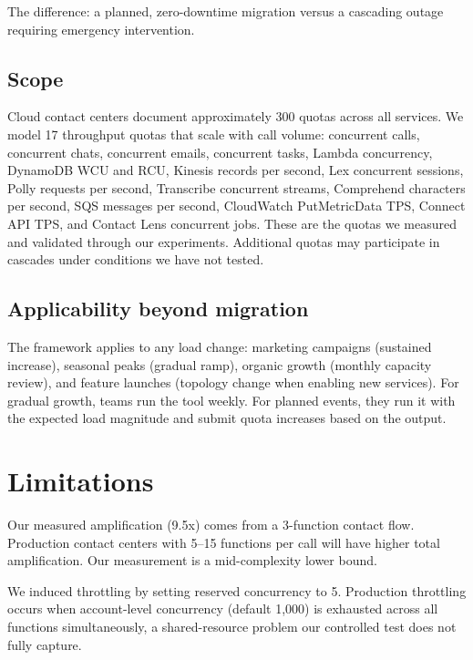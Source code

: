 \documentclass{article}
\begin{document}
The difference: a planned, zero-downtime migration versus a cascading outage requiring emergency intervention.

\subsection{Scope}

Cloud contact centers document approximately 300 quotas across all services. We model 17 throughput quotas that scale with call volume: concurrent calls, concurrent chats, concurrent emails, concurrent tasks, Lambda concurrency, DynamoDB WCU and RCU, Kinesis records per second, Lex concurrent sessions, Polly requests per second, Transcribe concurrent streams, Comprehend characters per second, SQS messages per second, CloudWatch PutMetricData TPS, Connect API TPS, and Contact Lens concurrent jobs. These are the quotas we measured and validated through our experiments. Additional quotas may participate in cascades under conditions we have not tested.

\subsection{Applicability beyond migration}

The framework applies to any load change: marketing campaigns (sustained increase), seasonal peaks (gradual ramp), organic growth (monthly capacity review), and feature launches (topology change when enabling new services). For gradual growth, teams run the tool weekly. For planned events, they run it with the expected load magnitude and submit quota increases based on the output.

\section{Limitations}

Our measured amplification (9.5x) comes from a 3-function contact flow. Production contact centers with 5--15 functions per call will have higher total amplification. Our measurement is a mid-complexity lower bound.

We induced throttling by setting reserved concurrency to 5. Production throttling occurs when account-level concurrency (default 1,000) is exhausted across all functions simultaneously, a shared-resource problem our controlled test does not fully capture.
\end{document}

